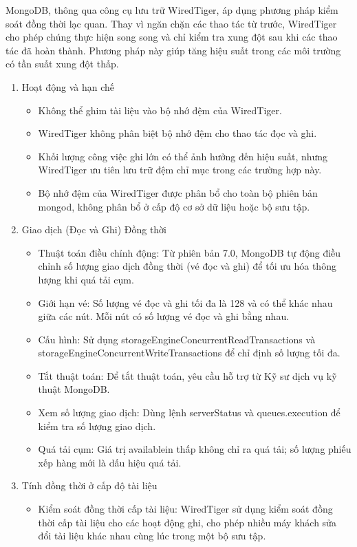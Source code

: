 MongoDB, thông qua công cụ lưu trữ WiredTiger, áp dụng phương pháp kiểm soát đồng thời lạc quan. Thay vì ngăn chặn các thao tác từ trước, WiredTiger cho phép chúng thực hiện song song và chỉ kiểm tra xung đột sau khi các thao tác đã hoàn thành. Phương pháp này giúp tăng hiệu suất trong các môi trường có tần suất xung đột thấp.
\begin{enumerate}
    \item Hoạt động và hạn chế
    \begin{itemize}
        \item Không thể ghim tài liệu vào bộ nhớ đệm của WiredTiger.
        \item WiredTiger không phân biệt bộ nhớ đệm cho thao tác đọc và ghi.
        \item Khối lượng công việc ghi lớn có thể ảnh hưởng đến hiệu suất, nhưng WiredTiger ưu tiên lưu trữ đệm chỉ mục trong các trường hợp này.
        \item Bộ nhớ đệm của WiredTiger được phân bổ cho toàn bộ phiên bản mongod, không phân bổ ở cấp độ cơ sở dữ liệu hoặc bộ sưu tập.
    \end{itemize}
    \item Giao dịch (Đọc và Ghi) Đồng thời
    \begin{itemize}
        \item Thuật toán điều chỉnh động: Từ phiên bản 7.0, MongoDB tự động điều chỉnh số lượng giao dịch đồng thời (vé đọc và ghi) để tối ưu hóa thông lượng khi quá tải cụm.
        \item Giới hạn vé: Số lượng vé đọc và ghi tối đa là 128 và có thể khác nhau giữa các nút. Mỗi nút có số lượng vé đọc và ghi bằng nhau.
        \item Cấu hình: Sử dụng storageEngineConcurrentReadTransactions và storageEngineConcurrentWriteTransactions để chỉ định số lượng tối đa.
        \item Tắt thuật toán: Để tắt thuật toán, yêu cầu hỗ trợ từ Kỹ sư dịch vụ kỹ thuật MongoDB.
        \item Xem số lượng giao dịch: Dùng lệnh serverStatus và queues.execution để kiểm tra số lượng giao dịch.
        \item Quá tải cụm: Giá trị availablein thấp không chỉ ra quá tải; số lượng phiếu xếp hàng mới là dấu hiệu quá tải.
    \end{itemize}
    \item Tính đồng thời ở cấp độ tài liệu
    \begin{itemize}
        \item Kiểm soát đồng thời cấp tài liệu: WiredTiger sử dụng kiểm soát đồng thời cấp tài liệu cho các hoạt động ghi, cho phép nhiều máy khách sửa đổi tài liệu khác nhau cùng lúc trong một bộ sưu tập.

\end{itemize}
\end{enumerate}
